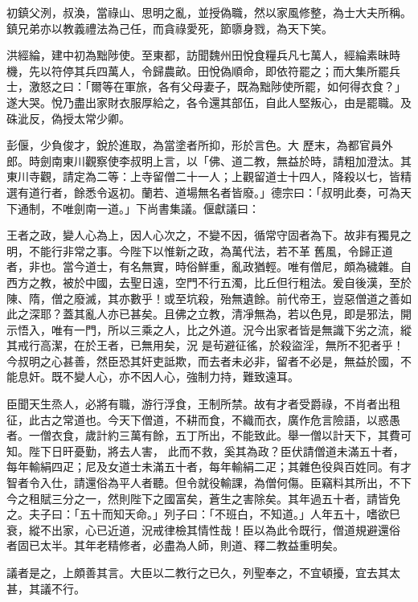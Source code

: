 \begin{pinyinscope}
 初鎮父洌，叔渙，當祿山、思明之亂，並授偽職，然以家風修整，為士大夫所稱。鎮兄弟亦以教義禮法為己任，而貪祿愛死，節隳身戮，為天下笑。



 洪經綸，建中初為黜陟使。至東都，訪聞魏州田悅食糧兵凡七萬人，經綸素昧時機，先以符停其兵四萬人，令歸農畝。田悅偽順命，即依符罷之；而大集所罷兵士，激怒之曰：「爾等在軍旅，各有父母妻子，既為黜陟使所罷，如何得衣食？」遂大哭。悅乃盡出家財衣服厚給之，各令還其部伍，自此人堅叛心，由是罷職。及硃泚反，偽授太常少卿。



 彭偃，少負俊才，銳於進取，為當塗者所抑，形於言色。大
 歷末，為都官員外郎。時劍南東川觀察使李叔明上言，以「佛、道二教，無益於時，請粗加澄汰。其東川寺觀，請定為二等：上寺留僧二十一人；上觀留道士十四人，降殺以七，皆精選有道行者，餘悉令返初。蘭若、道場無名者皆廢。」德宗曰：「叔明此奏，可為天下通制，不唯劍南一道。」下尚書集議。偃獻議曰：



 王者之政，變人心為上，因人心次之，不變不因，循常守固者為下。故非有獨見之明，不能行非常之事。今陛下以惟新之政，為萬代法，若不革
 舊風，令歸正道者，非也。當今道士，有名無實，時俗鮮重，亂政猶輕。唯有僧尼，頗為穢雜。自西方之教，被於中國，去聖日遠，空門不行五濁，比丘但行粗法。爰自後漢，至於陳、隋，僧之廢滅，其亦數乎！或至坑殺，殆無遺餘。前代帝王，豈惡僧道之善如此之深耶？蓋其亂人亦已甚矣。且佛之立教，清凈無為，若以色見，即是邪法，開示悟入，唯有一門，所以三乘之人，比之外道。況今出家者皆是無識下劣之流，縱其戒行高潔，在於王者，已無用矣，況
 是茍避征徭，於殺盜淫，無所不犯者乎！今叔明之心甚善，然臣恐其奸吏詆欺，而去者未必非，留者不必是，無益於國，不能息奸。既不變人心，亦不因人心，強制力持，難致遠耳。



 臣聞天生烝人，必將有職，游行浮食，王制所禁。故有才者受爵祿，不肖者出租征，此古之常道也。今天下僧道，不耕而食，不織而衣，廣作危言險語，以惑愚者。一僧衣食，歲計約三萬有餘，五丁所出，不能致此。舉一僧以計天下，其費可知。陛下日旰憂勤，將去人害，
 此而不救，奚其為政？臣伏請僧道未滿五十者，每年輸絹四疋；尼及女道士未滿五十者，每年輸絹二疋；其雜色役與百姓同。有才智者令入仕，請還俗為平人者聽。但令就役輸課，為僧何傷。臣竊料其所出，不下今之租賦三分之一，然則陛下之國富矣，蒼生之害除矣。其年過五十者，請皆免之。夫子曰：「五十而知天命。」列子曰：「不班白，不知道。」人年五十，嗜欲巳衰，縱不出家，心已近道，況戒律檢其情性哉！臣以為此令既行，僧道規避還俗
 者固已太半。其年老精修者，必盡為人師，則道、釋二教益重明矣。



 議者是之，上頗善其言。大臣以二教行之已久，列聖奉之，不宜頓擾，宜去其太甚，其議不行。




\end{pinyinscope}
